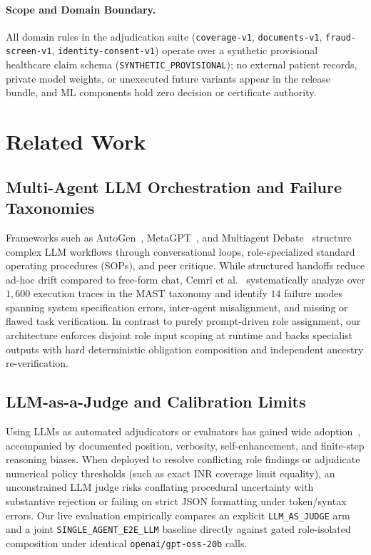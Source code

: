\documentclass[11pt,a4paper]{article}
\begin{document}
\paragraph{Scope and Domain Boundary.}
All domain rules in the adjudication suite (\texttt{coverage-v1}, \texttt{documents-v1}, \texttt{fraud-screen-v1}, \texttt{identity-consent-v1}) operate over a synthetic provisional healthcare claim schema (\texttt{SYNTHETIC\_PROVISIONAL}); no external patient records, private model weights, or unexecuted future variants appear in the release bundle, and ML components hold zero decision or certificate authority.

\section{Related Work}

\subsection{Multi-Agent LLM Orchestration and Failure Taxonomies}
Frameworks such as AutoGen~\citep{wu2023autogen}, MetaGPT~\citep{hong2024metagpt}, and Multiagent Debate~\citep{du2024debate} structure complex LLM workflows through conversational loops, role-specialized standard operating procedures (SOPs), and peer critique. While structured handoffs reduce ad-hoc drift compared to free-form chat, Cemri et al.~\citep{cemri2025mast} systematically analyze over $1{,}600$ execution traces in the MAST taxonomy and identify $14$ failure modes spanning system specification errors, inter-agent misalignment, and missing or flawed task verification. In contrast to purely prompt-driven role assignment, our architecture enforces disjoint role input scoping at runtime and backs specialist outputs with hard deterministic obligation composition and independent ancestry re-verification.

\subsection{LLM-as-a-Judge and Calibration Limits}
Using LLMs as automated adjudicators or evaluators has gained wide adoption~\citep{zheng2023judge}, accompanied by documented position, verbosity, self-enhancement, and finite-step reasoning biases. When deployed to resolve conflicting role findings or adjudicate numerical policy thresholds (such as exact INR coverage limit equality), an unconstrained LLM judge risks conflating procedural uncertainty with substantive rejection or failing on strict JSON formatting under token/syntax errors. Our live evaluation empirically compares an explicit \texttt{LLM\_AS\_JUDGE} arm and a joint \texttt{SINGLE\_AGENT\_E2E\_LLM} baseline directly against gated role-isolated composition under identical \texttt{openai/gpt-oss-20b} calls.
\end{document}
